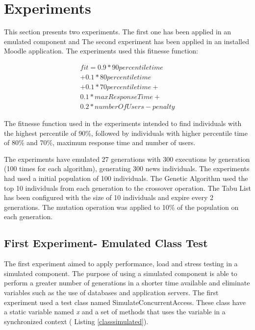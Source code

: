 \section{Experiments}

This section presents two experiments. The first one has been applied in an emulated component and The second experiment has been applied in an installed Moodle application. The experiments used this fitnesse function:

\begin{equation}
\begin{aligned}
fit=0.9* 90percentiletime\\
+0.1*80percentiletime\\+
0.1*70percentiletime+\\
0.1*maxResponseTime+\\
0.2*numberOfUsers-penalty
\end{aligned}
\end{equation}

The fitnesse function used in the experiments intended to find individuals with the highest percentile of 90\%, followed by individuals with higher percentile time of 80\% and 70\%, maximum response time and number of users.

The experiments have  emulated 27 generations with 300 executions by generation (100 times for each algorithm),  generating 300 news individuals. The experiments had used a initial population of 100 individuals. The Genetic Algorithm used the top 10 individuals from each generation to the crossover operation. The Tabu List has been configured with the size of 10 individuals and expire every 2 generations.  The mutation operation was applied to 10\% of the population on each generation. 

\subsection{First Experiment- Emulated Class Test}

The first experiment aimed to apply performance, load and stress testing in a simulated component. The purpose of using a simulated component is able to perform a greater number of generations in a shorter time available and eliminate variables such as the use of databases and application servers. The first experiment used a test class  named SimulateConcurrentAccess. These class have a static variable named \textit{x} and a set of methods that uses the variable in a synchronized context ( Listing \ref{classsimulated}).

